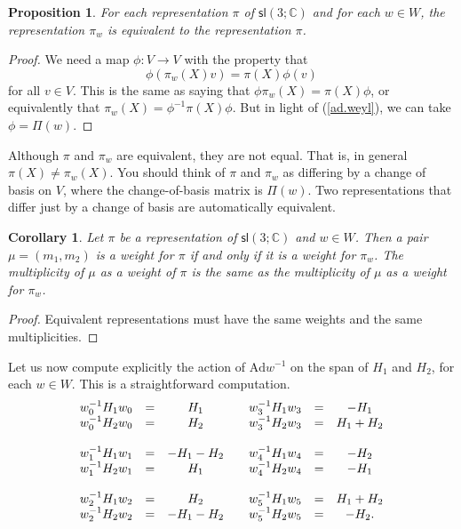 \documentclass[12pt]{amsbook}
\theoremstyle{plain}
\newtheorem{corollary}[theorem]{Corollary}
\newtheorem{proposition}[theorem]{Proposition}
\numberwithin{equation}{chapter}
\numberwithin{theorem}{chapter}
\begin{document}
\begin{proposition}
For each representation $\pi$ of $\mathsf{sl}\left(  3;\mathbb{C}\right)  $
and for each $w\in W$, the representation $\pi_{w}$ is equivalent to the
representation $\pi$.
\end{proposition}

\begin{proof}
We need a map $\phi:V\rightarrow V$ with the property that
\[
\phi\left(  \pi_{w}(X)v\right)  =\pi(X)\phi(v)
\]
for all $v\in V$. This is the same as saying that $\phi\pi_{w}(X)=\pi(X)\phi$,
or equivalently that $\pi_{w}(X)=\phi^{-1}\pi(X)\phi$. But in light of
(\ref{ad.weyl}), we can take $\phi=\Pi(w)$.
\end{proof}

Although $\pi$ and $\pi_{w}$ are equivalent, they are not equal. That is, in
general $\pi(X)\neq\pi_{w}(X)$. You should think of $\pi$ and $\pi_{w}$ as
differing by a change of basis on $V$, where the change-of-basis matrix is
$\Pi(w)$. Two representations that differ just by a change of basis are
automatically equivalent.

\begin{corollary}
\label{weyl.weights}Let $\pi$ be a representation of $\mathsf{sl}\left(
3;\mathbb{C}\right)  $ and $w\in W$. Then a pair $\mu=(m_{1},m_{2})$ is a
weight for $\pi$ if and only if it is a weight for $\pi_{w}$. The multiplicity
of $\mu$ as a weight of $\pi$ is the same as the multiplicity of $\mu$ as a
weight for $\pi_{w}$.
\end{corollary}

\begin{proof}
Equivalent representations must have the same weights and the same multiplicities.
\end{proof}

Let us now compute explicitly the action of $\mathrm{Ad}w^{-1}$ on the span of
$H_{1}$ and $H_{2}$, for each $w\in W$. This is a straightforward
computation.
\begin{equation}%
\begin{array}
[c]{ccccccc}%
w_{0}^{-1}H_{1}w_{0} & = & H_{1} &  & w_{3}^{-1}H_{1}w_{3} & = & -H_{1}\\
w_{0}^{-1}H_{2}w_{0} & = & H_{2} &  & w_{3}^{-1}H_{2}w_{3} & = & H_{1}+H_{2}\\
&  &  &  &  &  & \\
w_{1}^{-1}H_{1}w_{1} & = & -H_{1}-H_{2} &  & w_{4}^{-1}H_{1}w_{4} & = &
-H_{2}\\
w_{1}^{-1}H_{2}w_{1} & = & H_{1} &  & w_{4}^{-1}H_{2}w_{4} & = & -H_{1}\\
&  &  &  &  &  & \\
w_{2}^{-1}H_{1}w_{2} & = & H_{2} &  & w_{5}^{-1}H_{1}w_{5} & = & H_{1}+H_{2}\\
w_{2}^{-1}H_{2}w_{2} & = & -H_{1}-H_{2} &  & w_{5}^{-1}H_{2}w_{5} & = &
-H_{2}\text{.}%
\end{array}
\label{weyl.action}%
\end{equation}
\end{document}
